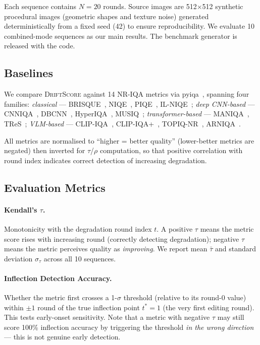 \documentclass[sigconf]{acmart}
\newcommand{\DS}{\textsc{DriftScore}}
\begin{document}
Each sequence contains $N = 20$ rounds.
Source images are 512$\times$512 synthetic procedural images (geometric
shapes and texture noise) generated deterministically from a fixed seed
(42) to ensure reproducibility.
We evaluate 10 combined-mode sequences as our main results.
The benchmark generator is released with the code.

\subsection{Baselines}
We compare \DS{} against 14 NR-IQA metrics via
pyiqa~\cite{pyiqa2022}, spanning four families:
\textit{classical} ---
  BRISQUE~\cite{mittal2012brisque},
  NIQE~\cite{mittal2013niqe},
  PIQE~\cite{piqe2015},
  IL-NIQE~\cite{zhang2015ilniqe};
\textit{deep CNN-based} ---
  CNNIQA~\cite{kang2014cnniqa},
  DBCNN~\cite{zhang2018dbcnn},
  HyperIQA~\cite{su2020hyperiqa},
  MUSIQ~\cite{ke2021musiq};
\textit{transformer-based} ---
  MANIQA~\cite{yang2022maniqa},
  TReS~\cite{golestaneh2022tres};
\textit{VLM-based} ---
  CLIP-IQA~\cite{wang2023clipiqa},
  CLIP-IQA+~\cite{wang2023clipiqa},
  TOPIQ-NR~\cite{chen2024topiq},
  ARNIQA~\cite{agnolucci2024arniqa}.

All metrics are normalised to ``higher = better quality'' (lower-better
metrics are negated) then inverted for $\tau$/$\rho$ computation, so
that positive correlation with round index indicates correct detection of
increasing degradation.

\subsection{Evaluation Metrics}
\paragraph{Kendall's $\tau$.}
Monotonicity with the degradation round index $t$.
A positive $\tau$ means the metric score rises with increasing round
(correctly detecting degradation); negative $\tau$ means the metric
perceives quality as \emph{improving}.
We report mean $\bar\tau$ and standard deviation $\sigma_\tau$ across all
10 sequences.

\paragraph{Inflection Detection Accuracy.}
Whether the metric first crosses a 1-$\sigma$ threshold (relative to its
round-0 value) within $\pm 1$ round of the true inflection point
$t^* = 1$ (the very first editing round).
This tests early-onset sensitivity.
Note that a metric with negative $\tau$ may still score 100\% inflection
accuracy by triggering the threshold \emph{in the wrong direction} ---
this is not genuine early detection.
\end{document}
